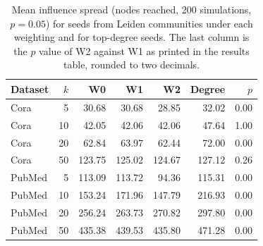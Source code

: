 \begin{table}[!t]
\centering
\caption{Mean influence spread (nodes reached, 200 simulations, $p=0.05$) for seeds from Leiden communities under each weighting and for top-degree seeds. The last column is the $p$ value of W2 against W1 as printed in the results table, rounded to two decimals.}
\label{tab:diffusion}
\footnotesize
\begin{tabular}{@{}lrrrrrr@{}}
\toprule
Dataset & $k$ & W0 & W1 & W2 & Degree & $p$ \\
\midrule
Cora & 5 & 30.68 & 30.68 & 28.85 & 32.02 & 0.00 \\
Cora & 10 & 42.05 & 42.06 & 42.06 & 47.64 & 1.00 \\
Cora & 20 & 62.84 & 63.97 & 62.44 & 72.00 & 0.00 \\
Cora & 50 & 123.75 & 125.02 & 124.67 & 127.12 & 0.26 \\
PubMed & 5 & 113.09 & 113.72 & 94.36 & 115.31 & 0.00 \\
PubMed & 10 & 153.24 & 171.96 & 147.79 & 216.93 & 0.00 \\
PubMed & 20 & 256.24 & 263.73 & 270.82 & 297.80 & 0.00 \\
PubMed & 50 & 435.38 & 439.53 & 435.80 & 471.28 & 0.00 \\
\bottomrule
\end{tabular}
\end{table}

